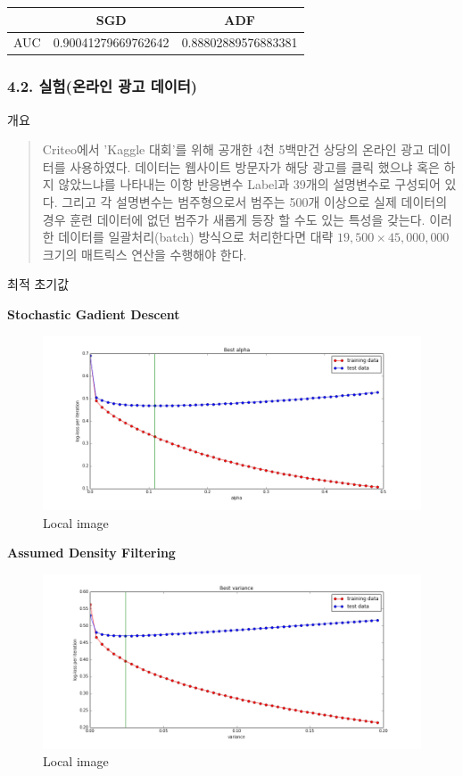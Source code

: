 \documentclass[11pt]{article}
\makeatletter
\def\maxwidth{\ifdim\Gin@nat@width>\linewidth\linewidth
    \else\Gin@nat@width\fi}
\let\Oldincludegraphics\includegraphics
\renewcommand{\includegraphics}[1]{\Oldincludegraphics[width=.8\maxwidth]{#1}}
\makeatother
\begin{document}
    \begin{longtable}[]{@{}lcc@{}}
\toprule
& SGD & ADF\tabularnewline
\midrule
\endhead
AUC & 0.90041279669762642 & 0.88802889576883381\tabularnewline
\bottomrule
\end{longtable}

    \subsubsection{4.2. 실험(온라인 광고
데이터)}\label{uxc2e4uxd5d8uxc628uxb77cuxc778-uxad11uxace0-uxb370uxc774uxd130}

    개요

    \begin{quote}
Criteo에서 'Kaggle 대회'를 위해 공개한 4천 5백만건 상당의 온라인 광고
데이터를 사용하였다. 데이터는 웹사이트 방문자가 해당 광고를 클릭 했으냐
혹은 하지 않았느냐를 나타내는 이항 반응변수 Label과 39개의 설명변수로
구성되어 있다. 그리고 각 설명변수는 범주형으로서 범주는 500개 이상으로
실제 데이터의 경우 훈련 데이터에 없던 범주가 새롭게 등장 할 수도 있는
특성을 갖는다. 이러한 데이터를 일괄처리(batch) 방식으로 처리한다면 대략
\(19,500 \times 45,000,000\) 크기의 매트릭스 연산을 수행해야 한다.
\end{quote}

    최적 초기값

    \textbf{Stochastic Gadient Descent}

    \begin{figure}[htbp]
\centering
\includegraphics{./images/best_param_sgd_C.png}
\caption{Local image}
\end{figure}



    \textbf{Assumed Density Filtering}

    \begin{figure}[htbp]
\centering
\includegraphics{./images/best_param_adf_C.png}
\caption{Local image}
\end{figure}
\end{document}
